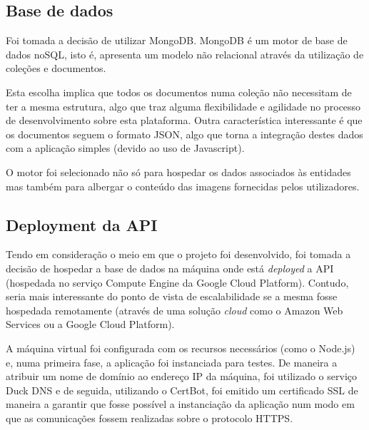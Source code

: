\subsection{Base de dados}

Foi tomada a decisão de utilizar MongoDB. MongoDB é um motor de base de dados noSQL, isto é, apresenta um modelo não relacional através da utilização de coleções e documentos.

\medskip \par

Esta escolha implica que todos os documentos numa coleção não necessitam de ter a mesma estrutura, algo que traz alguma flexibilidade e agilidade no processo de desenvolvimento sobre esta plataforma. Outra característica interessante é que os documentos seguem o formato JSON, algo que torna a integração destes dados com a aplicação simples (devido ao uso de Javascript).

\medskip \par

O motor foi selecionado não só para hospedar os dados associados às entidades mas também para albergar o conteúdo das imagens fornecidas pelos utilizadores.

\subsection{Deployment da API}

Tendo em consideração o meio em que o projeto foi desenvolvido, foi tomada a decisão de hospedar a base de dados na máquina onde está \textit{deployed} a API (hospedada no serviço Compute Engine da Google Cloud Platform). Contudo, seria mais interessante do ponto de vista de escalabilidade se a mesma fosse hospedada remotamente (através de uma solução \textit{cloud} como o Amazon Web Services ou a Google Cloud Platform).

\medskip \par

A máquina virtual foi configurada com os recursos necessários (como o Node.js) e, numa primeira fase, a aplicação foi instanciada para testes. De maneira a atribuir um nome de domínio ao endereço IP da máquina, foi utilizado o serviço Duck DNS e de seguida, utilizando o CertBot, foi emitido um certificado SSL de maneira a garantir que fosse possível a instanciação da aplicação num modo em que as comunicações fossem realizadas sobre o protocolo HTTPS.